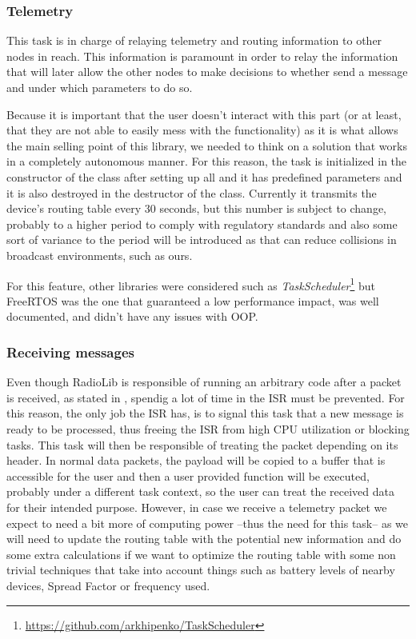 \subsubsection*{Telemetry}
This task is in charge of relaying telemetry and routing information to other nodes in reach. This information is paramount in order to relay the information that will later allow the other nodes to make decisions to whether send a message and under which parameters to do so.

Because it is important that the user doesn't interact with this part (or at least, that they are not able to easily mess with the functionality) as it is what allows the main selling point of this library, we needed to think on a solution that works in a completely autonomous manner. For this reason, the task is initialized in the constructor of the class after setting up all and it has predefined parameters and it is also destroyed in the destructor of the class. Currently it transmits the device's routing table every 30 seconds, but this number is subject to change, probably to a higher period to comply with regulatory standards and also some sort of variance to the period will be introduced as that can reduce collisions\cite{Floyd1994} in broadcast environments, such as ours.

For this feature, other libraries were considered such as \textit{TaskScheduler}\footnote{\url{https://github.com/arkhipenko/TaskScheduler}} but FreeRTOS was the one that guaranteed a low performance impact, was well documented, and didn't have any issues with OOP.

\subsubsection*{Receiving messages}
Even though RadioLib is responsible of running an arbitrary code after a packet is received, as stated in %
, spendig a lot of time in the ISR must be prevented. For this reason, the only job the ISR has, is to signal this task that a new message is ready to be processed, thus freeing the ISR from high CPU utilization or blocking tasks. This task will then be responsible of treating the packet depending on its header. In normal data packets, the payload will be copied to a buffer that is accessible for the user and then a user provided function will be executed, probably under a different task context, so the user can treat the received data for their intended purpose. However, in case we receive a telemetry packet we expect to need a bit more of computing power --thus the need for this task-- as we will need to update the routing table with the potential new information and do some extra calculations if we want to optimize the routing table with some non trivial techniques that take into account things such as battery levels of nearby devices, Spread Factor or frequency used.

